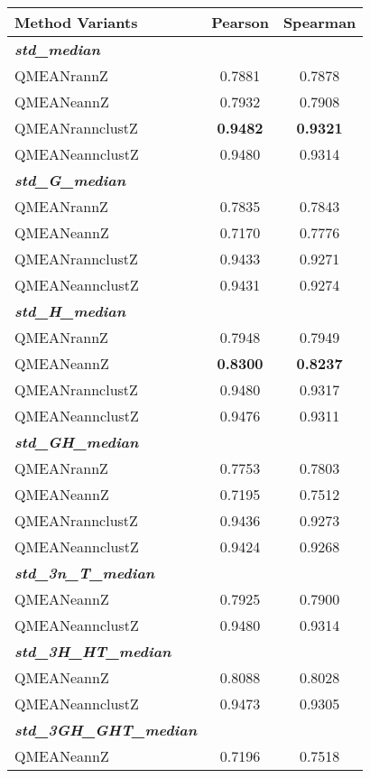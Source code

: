 \begin{table}[htbp]
\center
\begin{tabular}{lcc}
\toprule                %
\textbf{Method Variants} & \textbf{Pearson} & \textbf{Spearman} \\
	\midrule                %
	\emph{\textbf{std\_median}}	& &\\
	QMEANrannZ	&0.7881	&0.7878\\
 	QMEANeannZ	&0.7932	&0.7908\\
 	QMEANrannclustZ	&\textbf{0.9482}	&\textbf{0.9321}\\
 	QMEANeannclustZ	&0.9480	&0.9314\\
	\midrule                %
	\emph{\textbf{std\_G\_median}} 	& &\\
	QMEANrannZ	&0.7835	&0.7843\\
 	QMEANeannZ	&0.7170	&0.7776\\
 	QMEANrannclustZ	&0.9433	&0.9271\\
 	QMEANeannclustZ	&0.9431	&0.9274\\
	\midrule                %
	\emph{\textbf{std\_H\_median}} 	& &\\
	QMEANrannZ	&0.7948	&0.7949\\
 	QMEANeannZ	&\textbf{0.8300}	&\textbf{0.8237}\\
 	QMEANrannclustZ	&0.9480	&0.9317\\
 	QMEANeannclustZ	&0.9476	&0.9311\\
	\midrule                %
	\emph{\textbf{std\_GH\_median}}	& & \\
	QMEANrannZ	&0.7753	&0.7803\\
 	QMEANeannZ	&0.7195	&0.7512\\
 	QMEANrannclustZ	&0.9436	&0.9273\\
 	QMEANeannclustZ	&0.9424	&0.9268\\
	\midrule                %
	\emph{\textbf{std\_3n\_T\_median}}	& &\\
 	QMEANeannZ	&0.7925	&0.7900\\
 	QMEANeannclustZ	&0.9480	&0.9314\\
	\midrule                %
	\emph{\textbf{std\_3H\_HT\_median}}	& &\\
	QMEANeannZ	&0.8088	&0.8028\\
	QMEANeannclustZ	&0.9473	&0.9305\\		
	\midrule                %
	\emph{\textbf{std\_3GH\_GHT\_median}}	& &\\
 	QMEANeannZ	&0.7196	&0.7518\\

\end{tabular}
\end{table}
